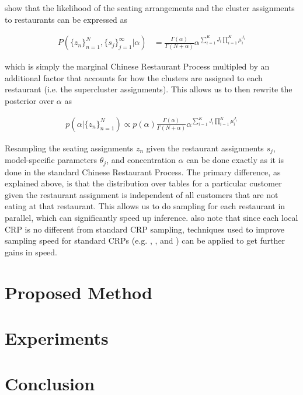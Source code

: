 \documentclass{article}
\begin{document}
\cite{lovell2012} show that the likelihood of the seating arrangements
and the cluster assignments to restaurants can be expressed as

\begin{align}
  P(\{z_n\}_{n=1}^N, \{s_j\}_{j=1}^\infty | \alpha) &=
  \frac{\Gamma(\alpha)}{\Gamma(N + \alpha)} \alpha^{\sum_{i=1}^K J_i \prod_{i=1}^K \mu_i^{J_i}}
\end{align}

which is simply the marginal Chinese Restaurant Process multipled by
an additional factor that accounts for how the clusters are assigned
to each restaurant (i.e. the supercluster assignments). This allows us
to then rewrite the posterior over $\alpha$ as

\begin{align}
  p(\alpha | \{z_n\}_{n=1}^N) \propto p(\alpha) \frac{\Gamma(\alpha)}{\Gamma(N + \alpha)} \alpha^{\sum_{i=1}^K J_i \prod_{i=1}^K \mu_i^{J_i}}
\end{align}

Resampling the seating assignments $z_n$ given the restaurant
assignments $s_j$, model-specific parameters $\theta_j$, and
concentration $\alpha$ can be done exactly as it is done in the
standard Chinese Restaurant Process. The primary difference, as
explained above, is that the distribution over tables for a particular
customer given the restaurant assignment is independent of all
customers that are not eating at that restaurant. This allows us to do
sampling for each restaurant in parallel, which can significantly
speed up inference. \cite{lovell2012} also note that since each local
CRP is no different from standard CRP sampling, techniques used to
improve sampling speed for standard CRPs (e.g. \cite{neal2000},
\cite{walker2007}, and \cite{papaspiliopoulos2008}) can be applied to
get further gains in speed.

\section{Proposed Method}
\label{sec:proposed-method}

\section{Experiments}
\label{sec:experiments}

\section{Conclusion}
\label{sec:conclusion}



\end{document}
